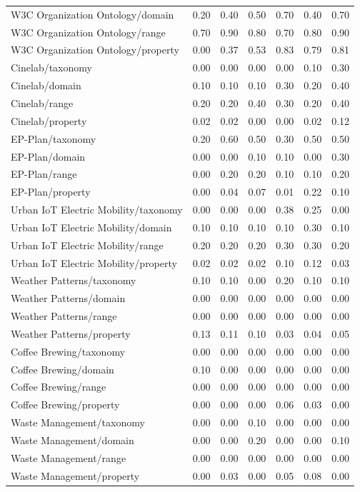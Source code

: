 \begin{tabular}{lcccccc}
W3C Organization Ontology/domain & 0.20 & 0.40 & 0.50 & 0.70 & 0.40 & 0.70 \\
W3C Organization Ontology/range & 0.70 & 0.90 & 0.80 & 0.70 & 0.80 & 0.90 \\
W3C Organization Ontology/property & 0.00 & 0.37 & 0.53 & 0.83 & 0.79 & 0.81 \\
Cinelab/taxonomy & 0.00 & 0.00 & 0.00 & 0.00 & 0.10 & 0.30 \\
Cinelab/domain & 0.10 & 0.10 & 0.10 & 0.30 & 0.20 & 0.40 \\
Cinelab/range & 0.20 & 0.20 & 0.40 & 0.30 & 0.20 & 0.40 \\
Cinelab/property & 0.02 & 0.02 & 0.00 & 0.00 & 0.02 & 0.12 \\
EP-Plan/taxonomy & 0.20 & 0.60 & 0.50 & 0.30 & 0.50 & 0.50 \\
EP-Plan/domain & 0.00 & 0.00 & 0.10 & 0.10 & 0.00 & 0.30 \\
EP-Plan/range & 0.00 & 0.20 & 0.20 & 0.10 & 0.10 & 0.20 \\
EP-Plan/property & 0.00 & 0.04 & 0.07 & 0.01 & 0.22 & 0.10 \\
Urban IoT Electric Mobility/taxonomy & 0.00 & 0.00 & 0.00 & 0.38 & 0.25 & 0.00 \\
Urban IoT Electric Mobility/domain & 0.10 & 0.10 & 0.10 & 0.10 & 0.30 & 0.10 \\
Urban IoT Electric Mobility/range & 0.20 & 0.20 & 0.20 & 0.30 & 0.30 & 0.20 \\
Urban IoT Electric Mobility/property & 0.02 & 0.02 & 0.02 & 0.10 & 0.12 & 0.03 \\
Weather Patterns/taxonomy & 0.10 & 0.10 & 0.00 & 0.20 & 0.10 & 0.10 \\
Weather Patterns/domain & 0.00 & 0.00 & 0.00 & 0.00 & 0.00 & 0.00 \\
Weather Patterns/range & 0.00 & 0.00 & 0.00 & 0.00 & 0.00 & 0.00 \\
Weather Patterns/property & 0.13 & 0.11 & 0.10 & 0.03 & 0.04 & 0.05 \\
Coffee Brewing/taxonomy & 0.00 & 0.00 & 0.00 & 0.00 & 0.00 & 0.00 \\
Coffee Brewing/domain & 0.10 & 0.00 & 0.00 & 0.00 & 0.00 & 0.00 \\
Coffee Brewing/range & 0.00 & 0.00 & 0.00 & 0.00 & 0.00 & 0.00 \\
Coffee Brewing/property & 0.00 & 0.00 & 0.00 & 0.06 & 0.03 & 0.00 \\
Waste Management/taxonomy & 0.00 & 0.00 & 0.10 & 0.00 & 0.00 & 0.00 \\
Waste Management/domain & 0.00 & 0.00 & 0.20 & 0.00 & 0.00 & 0.10 \\
Waste Management/range & 0.00 & 0.00 & 0.00 & 0.00 & 0.00 & 0.00 \\
Waste Management/property & 0.00 & 0.03 & 0.00 & 0.05 & 0.08 & 0.00 \\
\bottomrule
\end{tabular}

